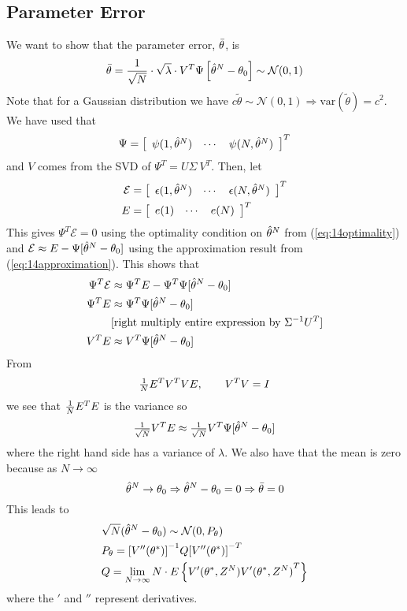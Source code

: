 \subsection{Parameter Error}
We want to show that the parameter error, $\bar{\theta}$, is
$$\bar{\theta} = \frac{1}{\sqrt{N}}\cdot\sqrt{\lambda}\cdot V^T\Psi\left[\hat{\theta}^N-\theta_0\right] \sim \mathcal{N}(0,1)$$
Note that for a Gaussian distribution we have $c\tilde{\theta}\sim\mathcal{N}(0,1)\Rightarrow \text{var}(\tilde{\theta})=c^2$.
We have used that
$$\Psi = \left[\begin{array}{c c c} \psi(1,\hat{\theta}^N) & \cdots & \psi(N,\hat{\theta}^N) \end{array}\right]^T$$
and $V$ comes from the SVD of $\Psi^T=U\Sigma~V^T$.
Then, let
\begin{align*}
\mathcal{E} &= \left[\begin{array}{c c c} \epsilon(1,\hat{\theta}^N) & \cdots & \epsilon(N,\hat{\theta}^N) \end{array}\right]^T \\
E &= \left[\begin{array}{c c c} e(1) & \cdots & e(N) \end{array}\right]^T
\end{align*}
This gives $\Psi^T\mathcal{E} = 0$ using the optimality condition on $\hat{\theta}^N$ from (\ref{eq:14optimality}) and $\mathcal{E} \approx E-\Psi[\hat{\theta}^N-\theta_0]$ using the approximation result from (\ref{eq:14approximation}).
This shows that
\begin{align*}
\Psi^T\mathcal{E} &\approx \Psi^T E-\Psi^T\Psi[\hat{\theta}^N-\theta_0] \\
\Psi^T E &\approx \Psi^T\Psi[\hat{\theta}^N-\theta_0] \\
&[\text{right multiply entire expression by } \Sigma^{-1}U^T] \\
V^T E &\approx V^T\Psi[\hat{\theta}^N-\theta_0]
\end{align*}
From
$$\tfrac{1}{N} E^T V^T VE, \qquad V^T V=I$$
we see that $\frac{1}{N} E^T E$ is the variance so
$$\tfrac{1}{\sqrt{N}}V^T E \approx \tfrac{1}{\sqrt{N}}V^T\Psi[\hat{\theta}^N-\theta_0]$$
where the right hand side has a variance of $\lambda$.
We also have that the mean is zero because as $N\to\infty$
$$\hat{\theta}^N\to\theta_0 \Rightarrow \hat{\theta}^N-\theta_0 = 0 \Rightarrow \bar{\theta} = 0$$
This leads to
\begin{align}
\begin{split}
&\sqrt{N}(\hat{\theta}^N-\theta_0) \sim \mathcal{N}(0,P_\theta) \\
&P_\theta = {\left[V''(\theta^\ast)\right]}^{-1}Q{\left[V''(\theta^\ast)\right]}^{-T} \\
&Q = \lim_{N\to\infty}N\cdot E\left\lbrace V'(\theta^\ast,Z^N)V'{(\theta^\ast,Z^N)}^T \right\rbrace
\end{split}
\end{align}
where the $'$ and $''$ represent derivatives.

